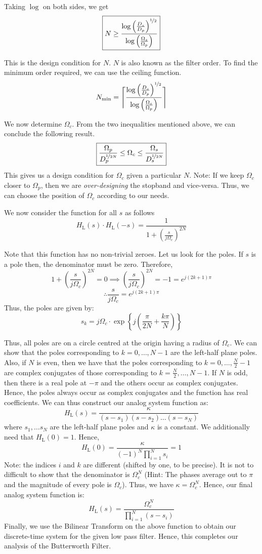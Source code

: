 \documentclass{article}
\theoremstyle{definition}
\DeclarePairedDelimiter{\ceil}{\lceil}{\rceil}
\newcommand\ddfrac[2]{\frac{\displaystyle #1}{\displaystyle #2}}
\begin{document}
Taking $\log$ on both sides, we get
\[
    \boxed{N \geq \frac{\log \left( \frac{D_s}{D_p}\right)^{\nicefrac{1}{2}}}{\log \left( \frac{\Omega_s}{\Omega_p}\right)}}
\]

This is the design condition for $N$. $N$ is also known as the filter order. To find the minimum order required, we can use the ceiling function.
\[
    N_{\text{min}} = \ceil[\Bigg]{\frac{\log \left( \frac{D_s}{D_p}\right)^{\nicefrac{1}{2}}}{\log \left( \frac{\Omega_s}{\Omega_p}\right)}}
\]

We now determine $\Omega_c$. From the two inequalities mentioned above, we can conclude the following result. 
\[
    \boxed{\frac{\Omega_p}{D_p^{\nicefrac{1}{2N}}} \leq \Omega_c \leq \frac{\Omega_s}{D_s^{\nicefrac{1}{2N}}}}
\]
This gives us a design condition for $\Omega_c$ given a particular $N$. Note: If we keep $\Omega_c$ closer to $\Omega_p$, then we are \textit{over-designing} the stopband and vice-versa. Thus, we can choose the position of $\Omega_c$ according to our needs. \smallskip

We now consider the function for all $s$ as follows
\[
    H_{\text{L}}(s) \cdot H_{\text{L}}(-s) = \ddfrac{1}{1 + \left( \frac{s}{j \Omega_c} \right)^{2N}}
\]

Note that this function has no non-trivial zeroes. Let us look for the poles. If $s$ is a pole then, the denominator must be zero. Therefore, 
\[
    1 + \left( \frac{s}{j \Omega_c} \right)^{2N} = 0 \implies \left( \frac{s}{j \Omega_c} \right)^{2N} = -1 = e^{j(2k+1)\pi}
\]
\[
    \therefore \frac{s}{j\Omega_c} = e^{j(2k+1)\pi}
\]
Thus, the poles are given by:
\[
    \boxed{s_k = j\Omega_c \cdot \exp{\left\{j \left(\frac{\pi}{2N} + \frac{k\pi}{N}\right)\right\}}}
\]  

Thus, all poles are on a circle centred at the origin having a radius of $\Omega_c$. We can show that the poles corresponding to $k = 0, \ldots , N-1$ are the left-half plane poles. Also, if $N$ is even, then we have that the poles corresponding to $k = 0 , \ldots , \frac{N}{2} - 1$ are complex conjugates of those corresponding to $k = \frac{N}{2} , \ldots , N-1$. If $N$ is odd, then there is a real pole at $-\pi$ and the others occur as complex conjugates. Hence, the poles always occur as complex conjugates and the function has real coefficients. We can thus construct our analog system function as:
\[
    H_{\text{L}}(s) = \frac{\kappa}{(s-s_1)(s-s_2) \ldots (s-s_N)}
\]
where $s_1, \ldots s_N$ are the left-half plane poles and $\kappa$ is a constant. We additionally need that $H_{\text{L}}(0) = 1$. Hence, 
\[
    H_{\text{L}}(0) = \frac{\kappa}{(-1)^N \prod\limits_{i=1}^{N} s_i} = 1
\]
Note: the indices $i$ and $k$ are different (shifted by one, to be precise). It is not to difficult to show that the denominator is $\Omega_c^N$ (Hint: The phases average out to $\pi$ and the magnitude of every pole is $\Omega_c$). Thus, we have $\kappa = \Omega_c^N$. Hence, our final analog system function is:
\[
    \boxed{H_{\text{L}}(s) = \frac{\Omega_c^N}{\prod\limits_{i = 1}^{N} (s - s_i)}}
\]
Finally, we use the Bilinear Transform on the above function to obtain our discrete-time system for the given low pass filter. Hence, this completes our analysis of the Butterworth Filter.
\end{document}
